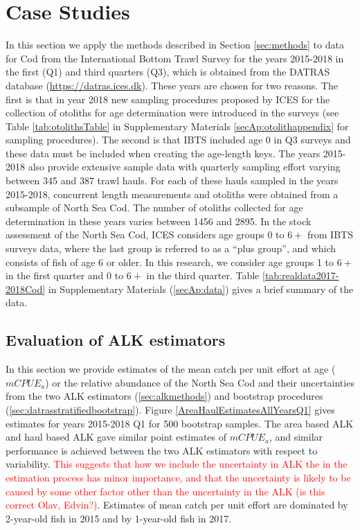 \documentclass[a4paper 12pt]{article}
\numberwithin{equation}{section}
\newcommand{\ed}[1]{\textcolor{red}{#1}}
\begin{document}
\section{Case Studies}
\label{sec:data}
In this section we apply the methods described in Section \ref{sec:methods} to data for Cod from the International Bottom Trawl Survey for the years 2015-2018 in the first (Q1) and third quarters (Q3), which is obtained from the DATRAS database (\href{https://datras.ices.dk}{https://datras.ices.dk}). These years are chosen for two reasons. The first is that in year 2018 new sampling procedures proposed by ICES for the collection of otoliths for age determination were introduced in the surveys (see Table \ref{tab:otolithsTable} in Supplementary Materials \ref{secAp:otolithappendix} for sampling procedures). The second is that IBTS included age 0 in Q3 surveys and these data must be included when creating the age-length keys. The years 2015-2018 also provide extensive sample data with quarterly sampling effort varying between 345 and 387 trawl hauls.  For each of these hauls sampled in the years 2015-2018, concurrent length measurements and otoliths were obtained from a subsample of North Sea Cod. The number of otoliths collected for age determination in these years varies between 1456 and 2895.  In the stock assessment of the North Sea Cod,  ICES considers age groups 0 to $6+$ from IBTS surveys data, where the last group is referred to as a ``plus group'', and which consists of fish of age 6 or older.  In this research, we consider age groups 1 to $6+$ in the first quarter and 0 to $6+$ in the third quarter. Table \ref{tab:realdata2017-2018Cod} in Supplementary Materials (\ref{secAp:data}) gives a brief summary of the data.

\subsection{Evaluation of ALK estimators}
\label{sec:EstimatesALK}
In this section we provide estimates of the mean catch per unit effort at age ($mCPUE_{a}$) or the relative abundance of the North Sea Cod  and their uncertainties from the two ALK estimators (\ref{sec:alkmethods}) and bootstrap procedures (\ref{sec:datrasstratifiedbootstrap}). Figure \ref{AreaHaulEstimatesAllYearsQ1} gives estimates for years 2015-2018 Q1 for 500 bootstrap samples. The area based ALK and haul based ALK gave similar point estimates of $mCPUE_{a}$, and similar performance is achieved between the two ALK estimators with respect to variability. \ed{This suggests that how we include the uncertainty in ALK the in the estimation process has minor importance, and that the uncertainty is likely to be caused by some other factor other than the uncertainty in the ALK \ed{(is this correct Olav, Edvin?)}}. Estimates of mean catch per unit effort are dominated by  2-year-old fish in 2015 and by 1-year-old fish in 2017.
\end{document}
